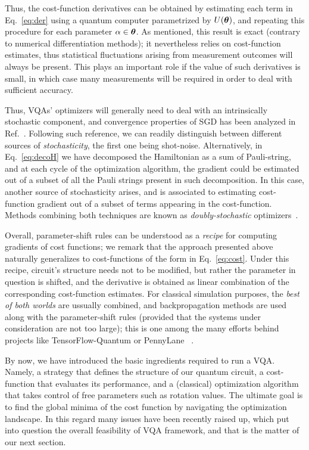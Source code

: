 Thus, the cost-function derivatives can be obtained by estimating each term in Eq.~\ref{eq:der} using a quantum computer parametrized by $U(\bm{\theta})$, and repeating this procedure for each parameter $\alpha \in \bm{\theta}$. As mentioned, this result is exact (contrary to numerical differentiation methods); it nevertheless relies on cost-function estimates, thus statistical fluctuations arising from measurement outcomes will always be present. This plays an important role if the value of such derivatives is small, in which case many measurements will be required in order to deal with sufficient accuracy.

Thus, VQAs' optimizers will generally need to deal with an intrinsically stochastic component, and convergence properties of SGD has been analyzed in Ref.~\cite{Sweke2020}. Following such reference, we can readily distinguish between different sources of \textit{stochasticity}, the first one being shot-noise. Alternatively, in Eq.~\ref{eq:decoH} we have decomposed the Hamiltonian as a sum of Pauli-string, and at each cycle of the optimization algorithm, the gradient could be estimated out of a subset of all the Pauli strings present in such decomposition. In this case, another source of stochasticity arises, and is associated to estimating cost-function gradient out of a subset of terms appearing in the cost-function. Methods combining both techniques are known as \textit{doubly-stochastic} optimizers~\cite{Sweke2020,harrow2019low}.

Overall, parameter-shift rules can be understood as a \textit{recipe} for computing gradients of cost functions; we remark that the approach presented above naturally generalizes to cost-functions of the form in Eq.~\ref{eq:cost}. Under this recipe, circuit's structure needs not to be modified, but rather the parameter in question is shifted, and the derivative is obtained as linear combination of the corresponding cost-function estimates. For classical simulation purposes, the \textit{best of both worlds} are ussually combined, and backpropagation methods are used along with the parameter-shift rules (provided that the systems under consideration are not too large); this is one among the many efforts behind projects like TensorFlow-Quantum or PennyLane ~\cite{bergholm2018pennylane,broughton2020tensorflow}.

By now, we have introduced the basic ingredients required to run a VQA. Namely, a strategy that defines the structure of our quantum circuit, a cost-function that evaluates its performance, and a (classical) optimization algorithm that takes control of free parameters such as rotation values. The ultimate goal is to find the global minima of the cost function by navigating the optimization landscape. In this regard many issues have been recently raised up, which put into question the overall feasibility of VQA framework, and that is the matter of our next section.
